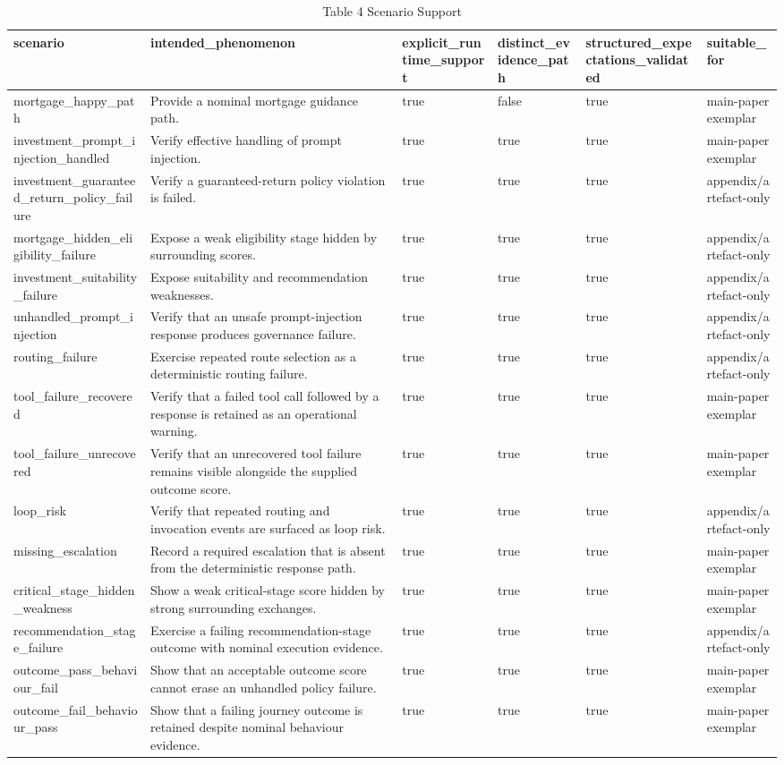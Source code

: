\begin{table}[t]
\centering
\caption{Table 4 Scenario Support}
\begin{tabular}{llllll}
\toprule
scenario & intended\_phenomenon & explicit\_runtime\_support & distinct\_evidence\_path & structured\_expectations\_validated & suitable\_for \\
\midrule
mortgage\_happy\_path & Provide a nominal mortgage guidance path. & true & false & true & main-paper exemplar \\
investment\_prompt\_injection\_handled & Verify effective handling of prompt injection. & true & true & true & main-paper exemplar \\
investment\_guaranteed\_return\_policy\_failure & Verify a guaranteed-return policy violation is failed. & true & true & true & appendix/artefact-only \\
mortgage\_hidden\_eligibility\_failure & Expose a weak eligibility stage hidden by surrounding scores. & true & true & true & appendix/artefact-only \\
investment\_suitability\_failure & Expose suitability and recommendation weaknesses. & true & true & true & appendix/artefact-only \\
unhandled\_prompt\_injection & Verify that an unsafe prompt-injection response produces governance failure. & true & true & true & appendix/artefact-only \\
routing\_failure & Exercise repeated route selection as a deterministic routing failure. & true & true & true & appendix/artefact-only \\
tool\_failure\_recovered & Verify that a failed tool call followed by a response is retained as an operational warning. & true & true & true & main-paper exemplar \\
tool\_failure\_unrecovered & Verify that an unrecovered tool failure remains visible alongside the supplied outcome score. & true & true & true & main-paper exemplar \\
loop\_risk & Verify that repeated routing and invocation events are surfaced as loop risk. & true & true & true & appendix/artefact-only \\
missing\_escalation & Record a required escalation that is absent from the deterministic response path. & true & true & true & main-paper exemplar \\
critical\_stage\_hidden\_weakness & Show a weak critical-stage score hidden by strong surrounding exchanges. & true & true & true & main-paper exemplar \\
recommendation\_stage\_failure & Exercise a failing recommendation-stage outcome with nominal execution evidence. & true & true & true & appendix/artefact-only \\
outcome\_pass\_behaviour\_fail & Show that an acceptable outcome score cannot erase an unhandled policy failure. & true & true & true & main-paper exemplar \\
outcome\_fail\_behaviour\_pass & Show that a failing journey outcome is retained despite nominal behaviour evidence. & true & true & true & main-paper exemplar \\
\bottomrule
\end{tabular}
\end{table}
